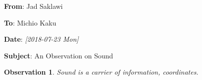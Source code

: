 \documentclass[11pt]{article}
\author{Jad Saklawi}
\date{\today}
\title{}
\begin{document}
\newtheorem*{observation}{Observation}

\begin{flushleft}
\textbf{From}: Jad Saklawi \par
\textbf{To}: Michio Kaku \par
\textbf{Date}: \textit{[2018-07-23 Mon]} \par
\textbf{Subject}: An Observation on Sound\\
\end{flushleft}



\begin{observation}
Sound is a carrier of information, coordinates.
\end{observation}
\end{document}

